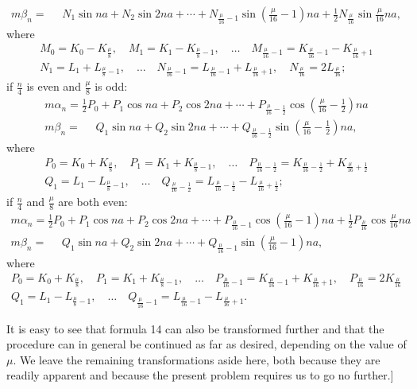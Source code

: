 \begin{landscape}
\[\begin{array}{l}
m\beta_n = \phantom{{}={}} N_1\sin na + N_2\sin 2na + \cdots + N_{\frac{\mu}{16}-1}\sin\left(\frac{\mu}{16}-1\right)na + \tfrac{1}{2}N_{\frac{\mu}{16}}\sin\frac{\mu}{16}na,
\end{array}
\]
where
\[
\begin{gathered}
M_0 = K_0 - K_{\frac{\mu}{8}}, \quad M_1 = K_1 - K_{\frac{\mu}{8}-1}, \quad \ldots \quad M_{\frac{\mu}{16}-1} = K_{\frac{\mu}{16}-1} - K_{\frac{\mu}{16}+1}\\[4pt]
N_1 = L_1 + L_{\frac{\mu}{8}-1}, \quad \ldots \quad N_{\frac{\mu}{16}-1} = L_{\frac{\mu}{16}-1} + L_{\frac{\mu}{16}+1}, \quad N_{\frac{\mu}{16}} = 2L_{\frac{\mu}{16}};
\end{gathered}
\]
if \(\frac{n}{4}\) is even and \(\frac{\mu}{8}\) is odd:
\[
\tag*{13)}
\begin{array}{l}
m\alpha_n = \tfrac{1}{2}P_0 + P_1\cos na + P_2\cos 2na + \cdots + P_{\frac{\mu}{16}-\frac{1}{2}}\cos\left(\frac{\mu}{16}-\frac{1}{2}\right)na \\[4pt]
m\beta_n = \phantom{{}={}} Q_1\sin na + Q_2\sin 2na + \cdots + Q_{\frac{\mu}{16}-\frac{1}{2}}\sin\left(\frac{\mu}{16}-\frac{1}{2}\right)na,
\end{array}
\]
where
\[
\begin{gathered}
P_0 = K_0 + K_{\frac{\mu}{8}}, \quad P_1 = K_1 + K_{\frac{\mu}{8}-1}, \quad \ldots \quad P_{\frac{\mu}{16}-\frac{1}{2}} = K_{\frac{\mu}{16}-\frac{1}{2}} + K_{\frac{\mu}{16}+\frac{1}{2}}\\[4pt]
Q_1 = L_1 - L_{\frac{\mu}{8}-1}, \quad \ldots \quad Q_{\frac{\mu}{16}-\frac{1}{2}} = L_{\frac{\mu}{16}-\frac{1}{2}} - L_{\frac{\mu}{16}+\frac{1}{2}};
\end{gathered}
\]
if \(\frac{n}{4}\) and \(\frac{\mu}{8}\) are both even:
\[
\tag*{14)}
\begin{array}{l}
m\alpha_n = \tfrac{1}{2}P_0 + P_1\cos na + P_2\cos 2na + \cdots + P_{\frac{\mu}{16}-1}\cos\left(\frac{\mu}{16}-1\right)na + \tfrac{1}{2}P_{\frac{\mu}{16}}\cos\frac{\mu}{16}na \\[4pt]
m\beta_n = \phantom{{}={}} Q_1\sin na + Q_2\sin 2na + \cdots + Q_{\frac{\mu}{16}-1}\sin\left(\frac{\mu}{16}-1\right)na,
\end{array}
\]
where
\[
\begin{gathered}
P_0 = K_0 + K_{\frac{\mu}{8}}, \quad P_1 = K_1 + K_{\frac{\mu}{8}-1}, \quad \ldots \quad P_{\frac{\mu}{16}-1} = K_{\frac{\mu}{16}-1} + K_{\frac{\mu}{16}+1}, \quad P_{\frac{\mu}{16}} = 2K_{\frac{\mu}{16}}\\[4pt]
Q_1 = L_1 - L_{\frac{\mu}{8}-1}, \quad \ldots \quad Q_{\frac{\mu}{16}-1} = L_{\frac{\mu}{16}-1} - L_{\frac{\mu}{16}+1}.
\end{gathered}
\]
\par\noindent\hspace*{\parindent}It is easy to see that formula 14 can also be transformed further and that the procedure can in general be continued as far as desired, depending on the value of \(\mu\). We leave the remaining transformations aside here, both because they are readily apparent and because the present problem requires us to go no further.]
\par
\endgroup
\end{landscape}
